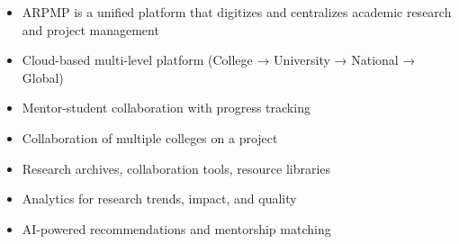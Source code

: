 \documentclass[aspectratio=169]{beamer}
\begin{document}
\begin{frame}{}

\vspace{0.5cm}

\begin{itemize}
\item ARPMP is a unified platform that digitizes and centralizes academic research and project management

\vspace{0.2cm}

\item Cloud-based multi-level platform (College → University → National → Global)

\vspace{0.2cm}

\item Mentor-student collaboration with progress tracking

\vspace{0.2cm}
\item Collaboration of multiple colleges on a project
\vspace{0.2cm}

\item Research archives, collaboration tools, resource libraries

\vspace{0.2cm}

\item Analytics for research trends, impact, and quality

\vspace{0.2cm}

\item AI-powered recommendations and mentorship matching

\end{itemize}

\end{frame}

\end{document}
